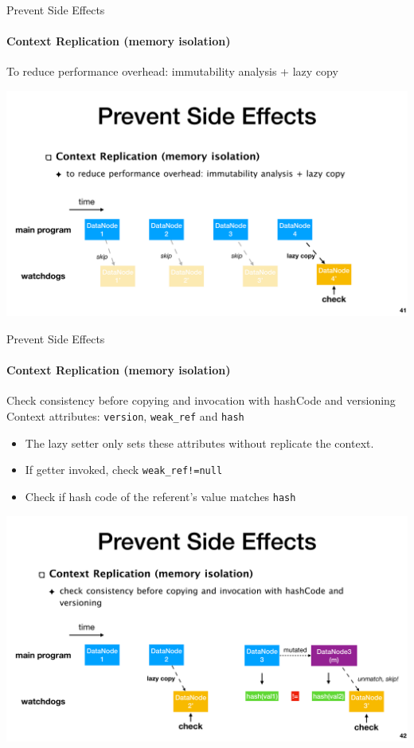 \documentclass[aspectratio=169]{beamer}
\begin{document}
\begin{frame}{Prevent Side Effects}
    \framesubtitle{Context Replication (memory isolation)}
    To reduce performance overhead: immutability analysis + lazy copy
    \begin{center}
        \includegraphics[width=.9\textwidth]{fig/lazy-copy}
    \end{center}
\end{frame}

\begin{frame}{Prevent Side Effects}
    \framesubtitle{Context Replication (memory isolation)}
    \begin{block}{Check consistency before copying and invocation with hashCode and versioning}
        Context attributes: \texttt{version}, \texttt{weak\_ref} and \texttt{hash}
        \begin{itemize}
            \item The lazy setter only sets these attributes without replicate the context. 
            \item If getter invoked, check \texttt{weak\_ref!=null}
            \item Check if hash code of the referent’s value matches \texttt{hash}
        \end{itemize}
    \end{block}
\begin{center}
    \includegraphics[width=.8\textwidth]{fig/hash}
\end{center}
\end{frame}
\end{document}
